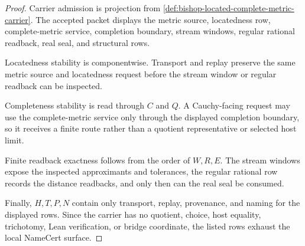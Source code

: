 \begin{proof}
Carrier admission is projection from \autoref{def:bishop-located-complete-metric-carrier}. The accepted packet displays the metric source, locatedness row, complete-metric service, completion boundary, stream windows, regular rational readback, real seal, and structural rows.

Locatedness stability is componentwise. Transport and replay preserve the same metric source and locatedness request before the stream window or regular readback can be inspected.

Completeness stability is read through $C$ and $Q$. A Cauchy-facing request may use the complete-metric service only through the displayed completion boundary, so it receives a finite route rather than a quotient representative or selected host limit.

Finite readback exactness follows from the order of $W,R,E$. The stream windows expose the inspected approximants and tolerances, the regular rational row records the distance readbacks, and only then can the real seal be consumed.

Finally, $H,T,P,N$ contain only transport, replay, provenance, and naming for the displayed rows. Since the carrier has no quotient, choice, host equality, trichotomy, Lean verification, or bridge coordinate, the listed rows exhaust the local NameCert surface.
\end{proof}

